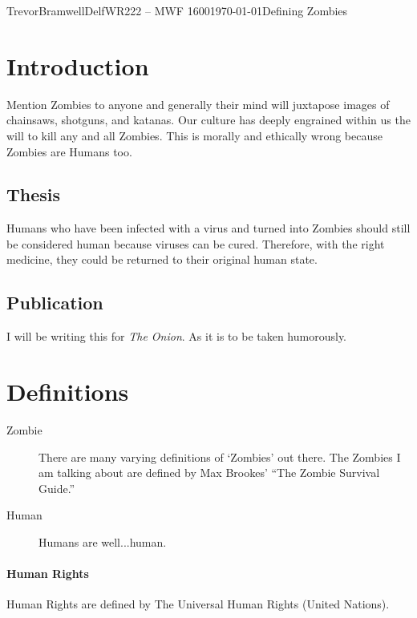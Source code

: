 \documentclass[12pt,letterpaper]{article}
\begin{document}
\begin{mla}{Trevor}{Bramwell}{Delf}{WR222 -- MWF 1600}{\today}{Defining Zombies}

\section*{Introduction}
Mention Zombies to anyone and generally their mind will juxtapose images of
chainsaws, shotguns, and katanas. Our culture has deeply engrained within us
the will to kill any and all Zombies. This is morally and ethically wrong
because Zombies are Humans too.

\subsection*{Thesis}
Humans who have been infected with a virus and turned into Zombies should
still be considered human because viruses can be cured. Therefore, with the
right medicine, they could be returned to their original human state.

\subsection*{Publication}
I will be writing this for \emph{The Onion}. As it is to be taken humorously.

\section*{Definitions}
    \begin{description}
        \item[Zombie]{There are many varying definitions of `Zombies' out there. The Zombies I am
        talking about are defined by Max Brookes' ``The Zombie Survival Guide.''}
        \item[Human]{Humans are well...human.}
    \end{description}



\paragraph{Human Rights}
Human Rights are defined by The Universal Human Rights (United Nations).



\end{mla}
\end{document}
